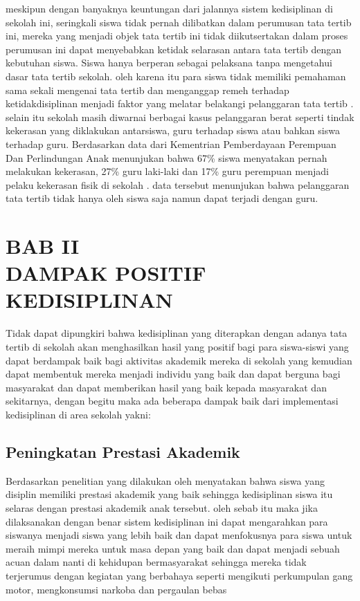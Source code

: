 \documentclass[f4paper,12pt, left=2.5cm,right=2cm,bottom=2cm, bahasa]{article}
\begin{document}
meskipun dengan banyaknya keuntungan dari jalannya sistem kedisiplinan di sekolah ini, seringkali siswa tidak pernah dilibatkan dalam perumusan tata tertib ini, mereka yang menjadi objek tata tertib ini tidak diikutsertakan dalam proses perumusan ini dapat menyebabkan ketidak selarasan antara tata tertib dengan kebutuhan siswa. Siswa hanya berperan sebagai pelaksana tanpa mengetahui dasar tata tertib sekolah. oleh karena itu para siswa tidak memiliki pemahaman sama sekali mengenai tata tertib dan menganggap remeh terhadap ketidakdisiplinan menjadi faktor yang melatar belakangi pelanggaran tata tertib \cite{anzalena2019faktor} . selain itu sekolah masih diwarnai berbagai kasus pelanggaran berat seperti tindak kekerasan yang diklakukan antarsiswa, guru terhadap siswa atau bahkan siswa terhadap guru. Berdasarkan data dari Kementrian Pemberdayaan Perempuan Dan Perlindungan Anak menunjukan bahwa 67\% siswa menyatakan pernah melakukan kekerasan, 27\% guru laki-laki dan 17\% guru perempuan menjadi pelaku kekerasan fisik di sekolah \cite{widodo2017sekolah}. data tersebut menunjukan bahwa pelanggaran tata tertib tidak hanya oleh siswa saja namun dapat terjadi dengan guru. 



\pagebreak

\section*{BAB II \\ DAMPAK POSITIF KEDISIPLINAN}
\setcounter{section}{2}
Tidak dapat dipungkiri bahwa kedisiplinan yang diterapkan dengan adanya tata tertib di sekolah akan menghasilkan hasil yang positif bagi para siswa-siswi yang dapat berdampak baik bagi aktivitas akademik mereka di sekolah yang kemudian dapat membentuk mereka menjadi individu yang baik dan dapat berguna bagi masyarakat dan dapat memberikan hasil yang baik kepada masyarakat dan sekitarnya, dengan begitu maka ada beberapa dampak baik dari implementasi kedisiplinan di area sekolah yakni:
\subsection{Peningkatan Prestasi Akademik}
Berdasarkan penelitian yang dilakukan oleh  \cite{zimmerman2014comparing} menyatakan bahwa siswa yang disiplin memiliki prestasi akademik yang baik sehingga kedisiplinan siswa itu selaras dengan prestasi akademik anak tersebut. oleh sebab itu maka jika dilaksanakan dengan benar sistem kedisiplinan ini dapat mengarahkan para siswanya menjadi siswa yang lebih baik dan dapat menfokusnya para siswa untuk meraih mimpi mereka untuk masa depan yang baik dan dapat menjadi sebuah acuan dalam nanti di kehidupan bermasyarakat sehingga mereka tidak terjerumus dengan kegiatan yang berbahaya seperti mengikuti perkumpulan gang motor, mengkonsumsi narkoba dan pergaulan bebas \cite{ariananda2014pengaruh}
\end{document}
